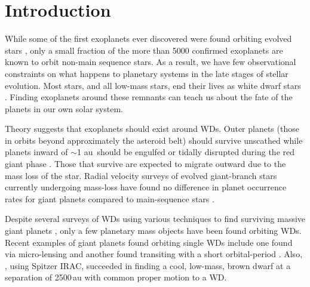 \documentclass[twocolumn]{aastex631}
\newcommand{\au}{\,au}
\begin{document}



\section{Introduction} \label{sec:intro}

While some of the first exoplanets ever discovered were found orbiting evolved stars \citep{Wolszczan1992Natur}, only a small fraction of the more than 5000 confirmed exoplanets are known to orbit non-main sequence stars. As a result, we have few observational constraints on what happens to planetary systems in the late stages of stellar evolution.  Most stars, and all low-mass stars, end their lives as white dwarf stars \citep[WDs,][]{fontaine01}. Finding exoplanets around these remnants can teach us about the fate of the planets in our own solar system.  

Theory suggests that exoplanets should exist around WDs. Outer planets (those in orbits beyond approximately the asteroid belt) should survive unscathed while planets inward of $\sim$1\,\au\ should be engulfed or tidally disrupted during the red giant phase \citep{Livio1984evolution, mustill2012}. Those that survive are expected to migrate outward due to the mass loss of the star.  
 Radial velocity surveys of evolved giant-branch stars currently undergoing mass-loss have found no difference in planet occurrence rates for giant planets compared to main-sequence stars \citep{Wolthoff2022}.

Despite several surveys of WDs using various techniques to find surviving massive giant planets \citep[e.g.][]{Burleigh2002, Debes2005II, Farihi08, Burleigh2008, Hogan2009,vansluijs2018, Brander2020}, only a few planetary mass objects have been found orbiting WDs. Recent examples of giant planets found orbiting single WDs include one found via micro-lensing \citep[MOA-2010-BLG-477Lb,][]{Blackman21} and another found transiting with a short orbital-period \citep[WD 1856+534 b,][]{Vanderburg2020Nature}. Also, \cite{Luhman2012}, using Spitzer IRAC, succeeded in finding a cool, low-mass, brown dwarf at a separation of 2500\,au with common proper motion to a WD.
\end{document}
